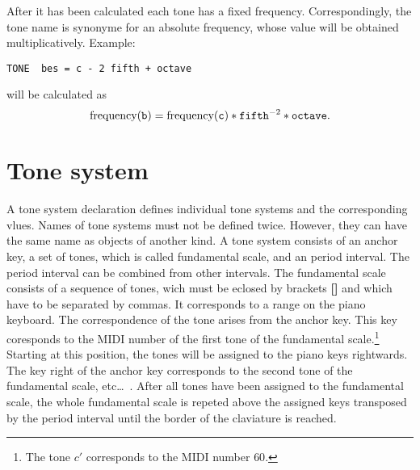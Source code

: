 After it has been calculated each tone has a fixed
frequency. Correspondingly, the tone name is synonyme for an absolute
frequency, whose value will be obtained
multiplicatively. Example:
\begin{lstlisting} 
TONE  bes = c - 2 fifth + octave 
\end{lstlisting}
will be calculated as 
\[
\text{frequency}(\texttt{b}) = \text{frequency}(\texttt{c}) *
\texttt{fifth}^{-2} * \texttt{octave}.
\]
\iffalse
Sämtliche Töne ergeben nach deren Berechnung immer eine feste Frequenz.
Ein Tonname steht also als Synonym für eine
absolute Frequenz\index{Frequenz!absolute}, deren
Wert sich multiplikativ ergibt. Beispiel:
\begin{lstlisting} 
TON  b = c - 2 quint + oktave 
\end{lstlisting}
wird berechnet als \[Frequenz(\mathtt{b}) = Frequenz(\mathtt{c}) *
\mathtt{quint}^{-2} * \mathtt{oktave}\].
\fi




\chapter{Tone system}\label{cha:tonsystem}
 A tone system declaration defines individual tone
systems and the corresponding vlues. Names of tone systems must not be
defined twice. However, they can have the same name as objects of
another kind. A tone system consists of an anchor key, a set of tones, which is called fundamental scale, and an
period interval. The period interval
can be combined from other intervals. The fundamental scale consists
of a sequence of tones, wich must be eclosed by brackets
\textbf{[]} and which have to be separated by
commas. It corresponds to a range on the piano keyboard. The
correspondence of the tone arises from the anchor key. This key
coresponds to the MIDI number of the first tone of
the fundamental scale.\footnote{The tone $c'$ corresponds to the MIDI
  number $60$.}
Starting at this position, the tones will be assigned to the piano
keys rightwards. The key right of the anchor key corresponds to the
second tone of the fundamental scale, etc\ldots\ . After all tones
have been assigned to the fundamental scale, the whole fundamental
scale is repeted above the assigned keys transposed by the period
interval\label{period interval} until the border of the claviature is
reached.

